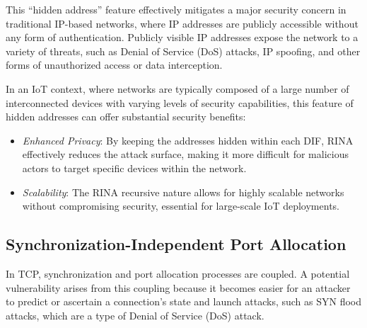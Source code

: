 \documentclass{ieeeaccess}
\begin{document}
This ``hidden address'' feature effectively mitigates a major security concern in traditional IP-based networks, where IP addresses are publicly accessible without any form of authentication. Publicly visible IP addresses expose the network to a variety of threats, such as Denial of Service (DoS) attacks, IP spoofing, and other forms of unauthorized access or data interception.

In an IoT context, where networks are typically composed of a large number of interconnected devices with varying levels of security capabilities, this feature of hidden addresses can offer substantial security benefits:

\begin{itemize}
	\item \textit{Enhanced Privacy}: By keeping the addresses hidden within each DIF, RINA effectively reduces the attack surface, making it more difficult for malicious actors to target specific devices within the network.
	\item \textit{Scalability}: The RINA recursive nature allows for highly scalable networks without compromising security, essential for large-scale IoT deployments.
\end{itemize}

\subsection{Synchronization-Independent Port Allocation}
In TCP, synchronization and port allocation processes are coupled. A potential vulnerability arises from this coupling because it becomes easier for an attacker to predict or ascertain a connection's state and launch attacks, such as SYN flood attacks, which are a type of Denial of Service (DoS) attack.
\end{document}
